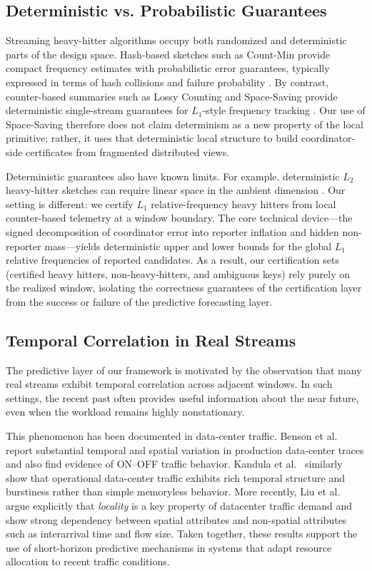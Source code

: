 \documentclass[sigconf, nonacm]{acmart}
\begin{document}
\subsection{Deterministic vs. Probabilistic Guarantees}
Streaming heavy-hitter algorithms occupy both randomized and deterministic parts of the design space. Hash-based sketches such as Count-Min provide compact frequency estimates with probabilistic error guarantees, typically expressed in terms of hash collisions and failure probability \cite{cormode2005improved}. By contrast, counter-based summaries such as Lossy Counting and Space-Saving provide deterministic single-stream guarantees for \(L_1\)-style frequency tracking \cite{manku2002approximate, metwally2005efficient}. Our use of Space-Saving therefore does not claim determinism as a new property of the local primitive; rather, it uses that deterministic local structure to build coordinator-side certificates from fragmented distributed views.

Deterministic guarantees also have known limits. For example, deterministic $L_2$ heavy-hitter sketches can require linear space in the ambient dimension \cite{braverman2018deterministic}. Our setting is different: we certify $L_1$ relative-frequency heavy hitters from local counter-based telemetry at a window boundary. The core technical device---the signed decomposition of coordinator error into reporter inflation and hidden non-reporter mass---yields deterministic upper and lower bounds for the global $L_1$ relative frequencies of reported candidates. As a result, our certification sets (certified heavy hitters, non-heavy-hitters, and ambiguous keys) rely purely on the realized window, isolating the correctness guarantees of the certification layer from the success or failure of the predictive forecasting layer.

\subsection{Temporal Correlation in Real Streams}
\label{subsec:related-temporal-correlation}

The predictive layer of our framework is motivated by the observation that many real streams exhibit temporal correlation across adjacent windows. In such settings, the recent past often provides useful information about the near future, even when the workload remains highly nonstationary.

This phenomenon has been documented in data-center traffic. Benson et al.~\cite{benson2009understanding} report substantial temporal and spatial variation in production data-center traces and also find evidence of ON--OFF traffic behavior. Kandula et al.~\cite{kandula2009nature} similarly show that operational data-center traffic exhibits rich temporal structure and burstiness rather than simple memoryless behavior. More recently, Liu et al.~\cite{liu2022locality} argue explicitly that \emph{locality} is a key property of datacenter traffic demand and show strong dependency between spatial attributes and non-spatial attributes such as interarrival time and flow size. Taken together, these results support the use of short-horizon predictive mechanisms in systems that adapt resource allocation to recent traffic conditions.
\end{document}
